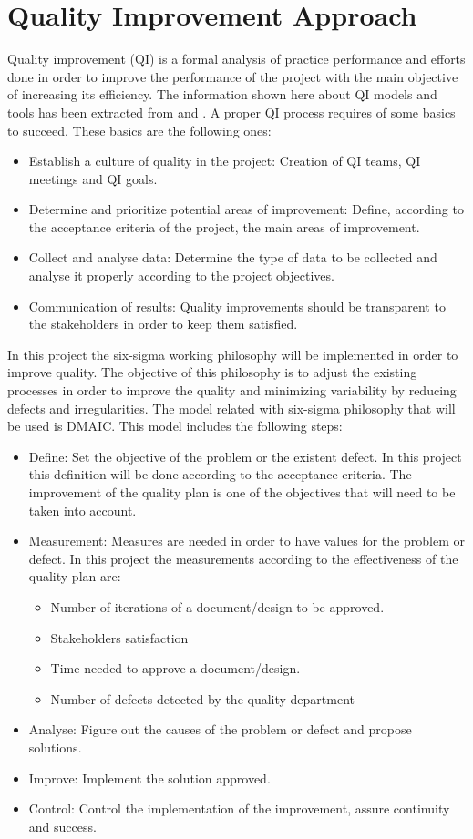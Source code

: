 \section{Quality Improvement Approach}
Quality improvement (QI) is a formal analysis of practice performance and efforts done in order to improve the performance of the project with the main objective of increasing its efficiency. The information shown here about QI models and tools has been extracted from \cite{aafp} and \cite{leansolutions}. A proper QI process requires of some basics to succeed. These basics are the following ones:
\begin{itemize}
\item Establish a culture of quality in the project: Creation of QI teams, QI meetings and QI goals.
\item Determine and prioritize potential areas of improvement: Define, according to the acceptance criteria of the project, the main areas of improvement.
\item Collect and analyse data: Determine the type of data to be collected and analyse it properly according to the project objectives.
\item Communication of results: Quality improvements should be transparent to the stakeholders in order to keep them satisfied. 
\end{itemize}
In this project the six-sigma working philosophy will be implemented in order to improve quality. The objective of this philosophy is to adjust the existing processes in order to improve the quality and minimizing variability by reducing defects and irregularities. The model related with six-sigma philosophy that will be used is DMAIC. This model includes the following steps:
\begin{itemize}
\item Define: Set the objective of the problem or the existent defect. In this project this definition will be done according to the acceptance criteria. The improvement of the quality plan is one of the objectives that will need to be taken into account.
\item Measurement: Measures are needed in order to have values for the problem or defect. In this project the measurements according to the effectiveness of the quality plan are:
\begin{itemize}
\item Number of iterations of a document/design to be approved.
\item Stakeholders satisfaction
\item Time needed to approve a document/design.
\item Number of defects detected by the quality department 
\end{itemize}
\item Analyse: Figure out the causes of the problem or defect and propose solutions.
\item Improve: Implement the solution approved.
\item Control: Control the implementation of the improvement, assure continuity and success.
\end{itemize}